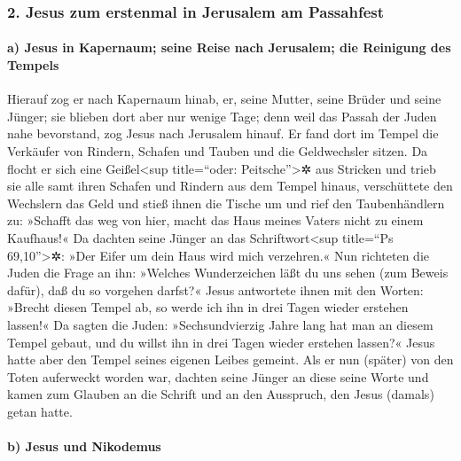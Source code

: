 \hypertarget{jesus-zum-erstenmal-in-jerusalem-am-passahfest}{%
\subsubsection{2. Jesus zum erstenmal in Jerusalem am
Passahfest}\label{jesus-zum-erstenmal-in-jerusalem-am-passahfest}}

\hypertarget{a-jesus-in-kapernaum-seine-reise-nach-jerusalem-die-reinigung-des-tempels}{%
\paragraph{a) Jesus in Kapernaum; seine Reise nach Jerusalem; die
Reinigung des
Tempels}\label{a-jesus-in-kapernaum-seine-reise-nach-jerusalem-die-reinigung-des-tempels}}

 Hierauf zog er nach Kapernaum hinab, er, seine Mutter,
seine Brüder und seine Jünger; sie blieben dort aber nur wenige Tage;
 denn weil das Passah der Juden nahe bevorstand, zog
Jesus nach Jerusalem hinauf.  Er fand dort im Tempel die
Verkäufer von Rindern, Schafen und Tauben und die Geldwechsler sitzen.
 Da flocht er sich eine Geißel\textless sup title=``oder:
Peitsche''\textgreater✲ aus Stricken und trieb sie alle samt ihren
Schafen und Rindern aus dem Tempel hinaus, verschüttete den Wechslern
das Geld und stieß ihnen die Tische um  und rief den
Taubenhändlern zu: »Schafft das weg von hier, macht das Haus meines
Vaters nicht zu einem Kaufhaus!«  Da dachten seine Jünger
an das Schriftwort\textless sup title=``Ps 69,10''\textgreater✲: »Der
Eifer um dein Haus wird mich verzehren.«  Nun richteten
die Juden die Frage an ihn: »Welches Wunderzeichen läßt du uns sehen
(zum Beweis dafür), daß du so vorgehen darfst?«  Jesus
antwortete ihnen mit den Worten: »Brecht diesen Tempel ab, so werde ich
ihn in drei Tagen wieder erstehen lassen!«  Da sagten die
Juden: »Sechsundvierzig Jahre lang hat man an diesem Tempel gebaut, und
du willst ihn in drei Tagen wieder erstehen lassen?« 
Jesus hatte aber den Tempel seines eigenen Leibes gemeint.
 Als er nun (später) von den Toten auferweckt worden war,
dachten seine Jünger an diese seine Worte und kamen zum Glauben an die
Schrift und an den Ausspruch, den Jesus (damals) getan hatte.

\hypertarget{b-jesus-und-nikodemus}{%
\paragraph{b) Jesus und Nikodemus}\label{b-jesus-und-nikodemus}}

